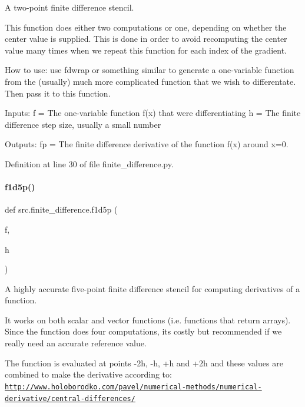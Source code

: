A two-\/point finite difference stencil. 

This function does either two computations or one, depending on whether the \textquotesingle{}center\textquotesingle{} value is supplied. This is done in order to avoid recomputing the center value many times when we repeat this function for each index of the gradient.

How to use\+: use fdwrap or something similar to generate a one-\/variable function from the (usually) much more complicated function that we wish to differentate. Then pass it to this function.

Inputs\+: f = The one-\/variable function f(x) that we\textquotesingle{}re differentiating h = The finite difference step size, usually a small number

Outputs\+: fp = The finite difference derivative of the function f(x) around x=0. 

Definition at line 30 of file finite\+\_\+difference.\+py.

\mbox{\label{namespacesrc_1_1finite__difference_af922da6a4776261be0b4d59b238fb20c}} 
\paragraph{\texorpdfstring{f1d5p()}{f1d5p()}}
{\footnotesize\ttfamily def src.\+finite\+\_\+difference.\+f1d5p (\begin{DoxyParamCaption}\item[{}]{f,  }\item[{}]{h }\end{DoxyParamCaption})}



A highly accurate five-\/point finite difference stencil for computing derivatives of a function. 

It works on both scalar and vector functions (i.\+e. functions that return arrays). Since the function does four computations, it\textquotesingle{}s costly but recommended if we really need an accurate reference value.

The function is evaluated at points -\/2h, -\/h, +h and +2h and these values are combined to make the derivative according to\+: \href{http://www.holoborodko.com/pavel/numerical-methods/numerical-derivative/central-differences/}{\tt http\+://www.\+holoborodko.\+com/pavel/numerical-\/methods/numerical-\/derivative/central-\/differences/}

